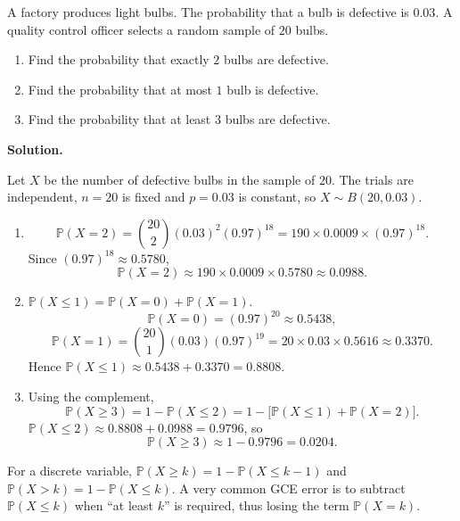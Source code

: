\documentclass[11pt]{article}
\begin{document}
\begin{exoresolu}
A factory produces light bulbs. The probability that a bulb is defective is $0.03$. A quality control officer selects a random sample of $20$ bulbs.
\begin{enumerate}
\item Find the probability that exactly $2$ bulbs are defective.
\item Find the probability that at most $1$ bulb is defective.
\item Find the probability that at least $3$ bulbs are defective.
\end{enumerate}
\tcblower
\textbf{Solution.}

Let $X$ be the number of defective bulbs in the sample of $20$. The trials are independent, $n=20$ is fixed and $p=0.03$ is constant, so $X \sim B(20, 0.03)$.
\begin{enumerate}
\item 
\[
\mathbb{P}(X = 2) = \binom{20}{2} (0.03)^2 (0.97)^{18}
= 190 \times 0.0009 \times (0.97)^{18}.
\]
Since $(0.97)^{18} \approx 0.5780$,
\[
\mathbb{P}(X = 2) \approx 190 \times 0.0009 \times 0.5780 \approx 0.0988.
\]
\item $\mathbb{P}(X \le 1) = \mathbb{P}(X = 0) + \mathbb{P}(X = 1)$.
\[
\mathbb{P}(X = 0) = (0.97)^{20} \approx 0.5438,
\]
\[
\mathbb{P}(X = 1) = \binom{20}{1}(0.03)(0.97)^{19} = 20 \times 0.03 \times 0.5616 \approx 0.3370.
\]
Hence $\mathbb{P}(X \le 1) \approx 0.5438 + 0.3370 = 0.8808$.
\item Using the complement,
\[
\mathbb{P}(X \ge 3) = 1 - \mathbb{P}(X \le 2) = 1 - \big[\mathbb{P}(X \le 1) + \mathbb{P}(X = 2)\big].
\]
$\mathbb{P}(X \le 2) \approx 0.8808 + 0.0988 = 0.9796$, so
\[
\mathbb{P}(X \ge 3) \approx 1 - 0.9796 = 0.0204.
\]
\end{enumerate}
\end{exoresolu}

\begin{attention}
For a discrete variable, $\mathbb{P}(X \ge k) = 1 - \mathbb{P}(X \le k-1)$ and $\mathbb{P}(X > k) = 1 - \mathbb{P}(X \le k)$. A very common GCE error is to subtract $\mathbb{P}(X \le k)$ when ``at least $k$'' is required, thus losing the term $\mathbb{P}(X=k)$.
\end{attention}
\end{document}
